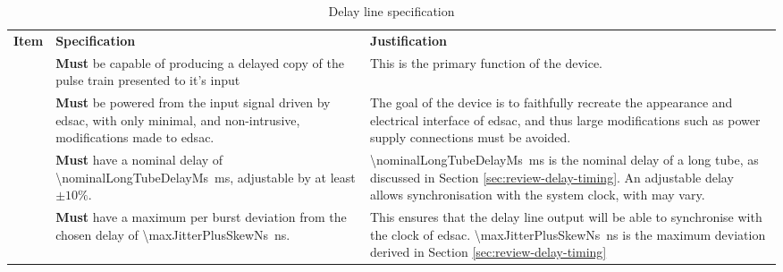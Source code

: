 \begin{longtable}{r  >{\raggedright}p{}  >{\raggedright}p{} }

	\caption{Delay line specification}\label{tbl:spec}\newcounter{specNo}\tabularnewline

	\toprule

	\bfseries Item & \bfseries Specification & \bfseries Justification \tabularnewline

	\midrule

	\endhead %

	\bottomrule

	\endfoot

	
	{specNo}\thespecNo\label{itm:spec-delay} & \textbf{Must} be capable of producing a delayed copy of the pulse train presented to it's input & This is the primary function of the device. \tabularnewline
	
	{specNo}\thespecNo\label{itm:spec-power} & \textbf{Must} be powered from the input signal driven by \gls{edsac}, with only minimal, and non-intrusive, modifications made to \gls{edsac}. & The goal of the device is to faithfully recreate the appearance and electrical interface of \gls{edsac}, and thus large modifications such as power supply connections must be avoided. \tabularnewline
	
	{specNo}\thespecNo\label{itm:spec-output-delay} & \textbf{Must} have a nominal delay of \SI{\nominalLongTubeDelayMs}{\milli\second}, adjustable by at least $\pm 10\%$. & \SI{\nominalLongTubeDelayMs}{\milli\second} is the nominal delay of a long tube, as discussed in Section \ref{sec:review-delay-timing}. An adjustable delay allows synchronisation with the system clock, with may vary. \tabularnewline
	
	
	{specNo}\thespecNo\label{itm:spec-skew-jitter} & \textbf{Must} have a maximum per burst deviation from the chosen delay of \SI{\maxJitterPlusSkewNs}{\nano\second}. & This ensures that the delay line output will be able to synchronise with the clock of \gls{edsac}. \SI{\maxJitterPlusSkewNs}{\nano\second} is the maximum deviation derived in Section \ref{sec:review-delay-timing} \tabularnewline
	

\end{longtable}
